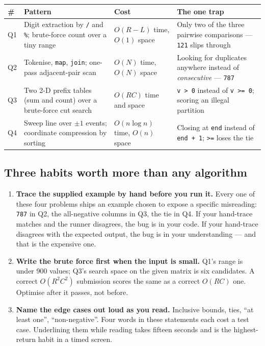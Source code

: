 \documentclass[11pt,a4paper]{article}
\begin{document}
\noindent\begin{tabular}{@{}p{1.1cm}>{\raggedright\arraybackslash}p{4.3cm}>{\raggedright\arraybackslash}p{4.6cm}>{\raggedright\arraybackslash}p{4.3cm}@{}}
\toprule
\textbf{\#} & \textbf{Pattern} & \textbf{Cost} & \textbf{The one trap} \\
\midrule
Q1 & Digit extraction by \texttt{/} and \texttt{\%}; brute-force count over a
     tiny range
   & $O(R-L)$ time, $O(1)$ space
   & Only two of the three pairwise comparisons --- \texttt{121} slips through \\
\addlinespace
Q2 & Tokenise, \texttt{map}, \texttt{join}; one-pass adjacent-pair scan
   & $O(N)$ time, $O(N)$ space
   & Looking for duplicates anywhere instead of \emph{consecutive} --- \texttt{787} \\
\addlinespace
Q3 & Two 2-D prefix tables (sum and count) over a brute-force cut search
   & $O(RC)$ time and space
   & \texttt{v > 0} instead of \texttt{v >= 0}; scoring an illegal partition \\
\addlinespace
Q4 & Sweep line over $\pm 1$ events; coordinate compression by sorting
   & $O(n \log n)$ time, $O(n)$ space
   & Closing at \texttt{end} instead of \texttt{end + 1}; \texttt{>=} loses the tie \\
\bottomrule
\end{tabular}

\subsection*{Three habits worth more than any algorithm}

\begin{enumerate}
  \item \textbf{Trace the supplied example by hand before you run it.} Every one
        of these four problems ships an example chosen to expose a specific
        misreading: \texttt{787} in Q2, the all-negative columns in Q3, the tie
        in Q4. If your hand-trace matches and the runner disagrees, the bug is
        in your code. If your hand-trace disagrees with the expected output, the
        bug is in your understanding --- and that is the expensive one.
  \item \textbf{Write the brute force first when the input is small.} Q1's range
        is under 900 values; Q3's search space on the given matrix is six
        candidates. A correct $O(R^2C^2)$ submission scores the same as a
        correct $O(RC)$ one. Optimise after it passes, not before.
  \item \textbf{Name the edge cases out loud as you read.} Inclusive bounds,
        ties, ``at least one'', ``non-negative''. Four words in these statements
        each cost a test case. Underlining them while reading takes fifteen
        seconds and is the highest-return habit in a timed screen.
\end{enumerate}
\end{document}

